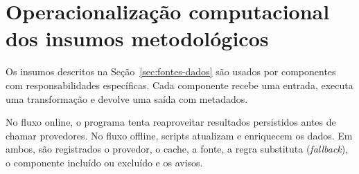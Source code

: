\section{Operacionalização computacional dos insumos metodológicos}
\label{sec:operacionalizacao-insumos}

Os insumos descritos na Seção~\ref{sec:fontes-dados} são usados por componentes com responsabilidades específicas. Cada componente recebe uma entrada, executa uma transformação e devolve uma saída com metadados.

No fluxo online, o programa tenta reaproveitar resultados persistidos antes de chamar provedores. No fluxo offline, scripts atualizam e enriquecem os dados. Em ambos, são registrados o provedor, o cache, a fonte, a regra substituta (\emph{fallback}), o componente incluído ou excluído e os avisos.

